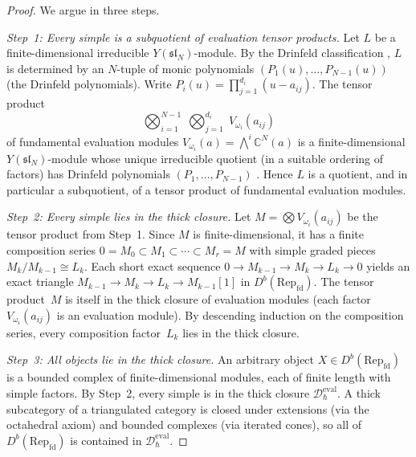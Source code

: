 \begin{proof}
We argue in three steps.

\emph{Step~1: Every simple is a subquotient of evaluation tensor
products.}
Let $L$ be a finite-dimensional irreducible
$Y(\mathfrak{sl}_N)$-module. By the Drinfeld classification
\cite{Drinfeld88}, $L$ is determined by an $N$-tuple of monic
polynomials $(P_1(u), \ldots, P_{N-1}(u))$ (the Drinfeld
polynomials). Write $P_i(u) = \prod_{j=1}^{d_i}(u - a_{ij})$.
The tensor product
\[
\bigotimes_{i=1}^{N-1}\; \bigotimes_{j=1}^{d_i}\;
V_{\omega_i}(a_{ij})
\]
of fundamental evaluation modules
$V_{\omega_i}(a) = \bigwedge^i \mathbb{C}^N(a)$ is a finite-dimensional
$Y(\mathfrak{sl}_N)$-module whose unique irreducible quotient (in a suitable
ordering of factors) has Drinfeld polynomials $(P_1, \ldots, P_{N-1})$
\cite{Drinfeld88}. Hence $L$ is a quotient, and in particular a
subquotient, of a tensor product of fundamental evaluation modules.

\emph{Step~2: Every simple lies in the thick closure.}
Let $M = \bigotimes V_{\omega_i}(a_{ij})$ be the tensor product
from Step~1. Since $M$ is finite-dimensional, it has a
finite composition series $0 = M_0 \subset M_1 \subset \cdots
\subset M_r = M$ with simple graded pieces
$M_k/M_{k-1} \cong L_k$. Each short exact sequence
$0 \to M_{k-1} \to M_k \to L_k \to 0$ yields an exact triangle
$M_{k-1} \to M_k \to L_k \to M_{k-1}[1]$ in
$D^b(\mathrm{Rep}_{\mathrm{fd}})$. The tensor product~$M$ is itself
in the thick closure of evaluation modules (each factor
$V_{\omega_i}(a_{ij})$ is an evaluation module). By descending
induction on the composition series, every composition factor~$L_k$
lies in the thick closure.

\emph{Step~3: All objects lie in the thick closure.}
An arbitrary object $X \in D^b(\mathrm{Rep}_{\mathrm{fd}})$ is a
bounded complex of finite-dimensional modules, each of finite length
with simple factors. By Step~2, every simple is in the thick closure
$\mathcal{D}_{\hbar}^{\mathrm{eval}}$. A thick subcategory of a
triangulated category is closed under extensions (via the octahedral
axiom) and bounded complexes (via iterated cones), so all of
$D^b(\mathrm{Rep}_{\mathrm{fd}})$ is contained in
$\mathcal{D}_{\hbar}^{\mathrm{eval}}$.
\end{proof}

